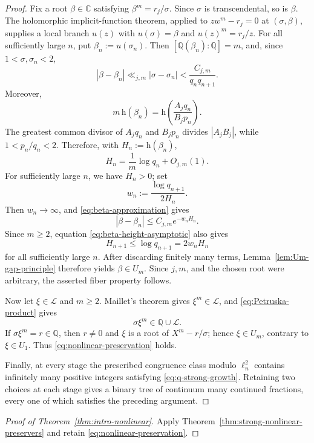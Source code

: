 \documentclass[11pt]{amsart}
\numberwithin{equation}{section}
\theoremstyle{definition}
\theoremstyle{remark}
\newcommand{\Q}{\mathbb Q}
\newcommand{\C}{\mathbb C}
\newcommand{\Lio}{\mathscr L}
\newcommand{\abs}[1]{\left\lvert #1\right\rvert}
\begin{document}
\begin{proof}
Fix a root \(\beta\in\C\) satisfying \(\beta^m=r_j/\sigma\).
Since \(\sigma\) is transcendental, so is \(\beta\).
The holomorphic implicit-function theorem, applied to
\(zw^m-r_j=0\) at \((\sigma,\beta)\), supplies a local branch
\(u(z)\) with \(u(\sigma)=\beta\) and \(u(z)^m=r_j/z\). For all
sufficiently large \(n\), put \(\beta_n:=u(\sigma_n)\). Then
\([\Q(\beta_n):\Q]=m\), and, since \(1<\sigma,\sigma_n<2\),
\begin{equation}\label{eq:beta-approximation}
|\beta-\beta_n|
\ll_{j,m}\abs{\sigma-\sigma_n}
<\frac{C_{j,m}}{q_nq_{n+1}}.
\end{equation}
Moreover,
\[
m\,\mathrm h(\beta_n)
=
\mathrm h\left(\frac{A_jq_n}{B_jp_n}\right).
\]
The greatest common divisor of \(A_jq_n\) and \(B_jp_n\) divides
\(|A_jB_j|\), while \(1<p_n/q_n<2\). Therefore, with
\(H_n:=\mathrm h(\beta_n)\),
\begin{equation}\label{eq:beta-height-asymptotic}
H_n=\frac1m\log q_n+O_{j,m}(1).
\end{equation}
For sufficiently large \(n\), we have \(H_n>0\); set
\[
w_n:=\frac{\log q_{n+1}}{2H_n}.
\]
Then \(w_n\to\infty\), and \eqref{eq:beta-approximation} gives
\[
|\beta-\beta_n|\leq C_{j,m}e^{-w_nH_n}.
\]
Since \(m\geq2\), equation \eqref{eq:beta-height-asymptotic} also gives
\[
H_{n+1}\leq\log q_{n+1}=2w_nH_n
\]
for all sufficiently large \(n\). After discarding finitely many
terms, Lemma~\ref{lem:Um-gap-principle} therefore yields
\(\beta\in U_m\). Since \(j,m\), and the chosen root were arbitrary,
the asserted fiber property follows.

Now let \(\xi\in\Lio\) and \(m\geq2\). Maillet's theorem gives
\(\xi^m\in\Lio\), and \eqref{eq:Petruska-product} gives
\[
\sigma\xi^m\in\Q\cup\Lio.
\]
If \(\sigma\xi^m=r\in\Q\), then \(r\neq0\) and \(\xi\) is a root of
\(X^m-r/\sigma\); hence \(\xi\in U_m\), contrary to
\(\xi\in U_1\). Thus \eqref{eq:nonlinear-preservation} holds.

Finally, at every stage the prescribed congruence class modulo
\(\ell_n^2\) contains infinitely many positive integers satisfying
\eqref{eq:q-strong-growth}. Retaining two choices at each stage gives
a binary tree of continuum many continued fractions, every one of which
satisfies the preceding argument.
\end{proof}

\begin{proof}[Proof of Theorem~\ref{thm:intro-nonlinear}]
Apply Theorem~\ref{thm:strong-nonlinear-preservers} and retain
\eqref{eq:nonlinear-preservation}.
\end{proof}
\end{document}
